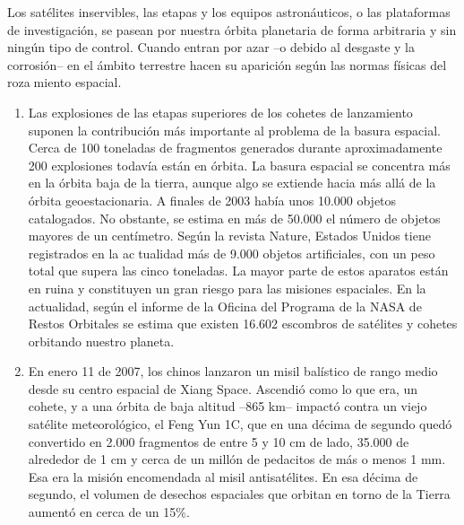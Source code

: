 \documentclass[12pt,letterpaper]{article}
\begin{document}
\begin{multicols}{2}
\noindent Los satélites inservibles, las etapas y los equipos astronáuticos, o las plataformas
de investigación, se pasean por nuestra órbita planetaria de forma arbitraria y sin ningún tipo de control. Cuando entran por azar –o debido al desgaste y la corrosión– en el ámbito terrestre hacen su aparición según las normas físicas del rozamiento espacial.
\begin{enumerate}
    \item Las explosiones de las etapas superiores de los cohetes de lanzamiento suponen la contribución más importante al problema de la basura espacial. Cerca de 100 toneladas de fragmentos generados durante aproximadamente 200 explosiones todavía están en órbita. La basura espacial se concentra más en la órbita baja de la tierra, aunque algo se extiende hacia más allá de la órbita geoestacionaria. A finales de 2003 había unos 10.000 objetos catalogados. No obstante, se estima en más de 50.000 el número de objetos mayores de un centímetro. Según la revista Nature, Estados Unidos tiene registrados en la actualidad más de 9.000 objetos artificiales, con un peso total que supera las cinco toneladas. La mayor parte de estos aparatos están en ruina y constituyen un gran riesgo para las misiones espaciales. En la actualidad, según el informe de la Oficina del Programa de la NASA de Restos Orbitales se estima que existen 16.602 escombros de satélites y cohetes orbitando nuestro planeta.
    \item En enero 11 de 2007, los chinos lanzaron un misil balístico de rango medio desde su centro espacial de Xiang Space. Ascendió como lo que era, un cohete, y a una órbita de baja altitud –865 km– impactó contra un viejo satélite meteorológico, el Feng Yun 1C, que en una décima de segundo quedó convertido en 2.000 fragmentos de entre 5 y 10 cm de lado, 35.000 de alrededor de 1 cm y cerca de un millón de pedacitos de más o menos 1 mm. Esa era la misión encomendada al misil antisatélites. En esa décima de segundo, el volumen de desechos espaciales que orbitan en torno de la Tierra aumentó en cerca de un 15\%.
\end{enumerate}
\end{multicols}
\newpage

\pagestyle{fancy}
        \fancyhf{}
        \rhead{}
  
\end{document}
